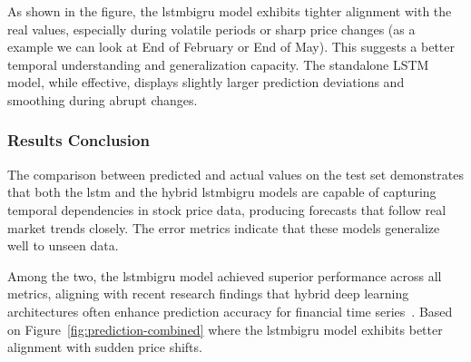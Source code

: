 As shown in the figure, the \acrshort{lstmbigru} model exhibits tighter alignment 
with the real values, especially during volatile periods or sharp price changes 
(as a example we can look at End of February or End of May). This
suggests a better temporal understanding and generalization capacity. The standalone
LSTM model, while effective, displays slightly larger prediction deviations and 
smoothing during abrupt changes.

\subsubsection{Results Conclusion}

The comparison between predicted and actual values on the test set demonstrates that 
both the \acrshort{lstm} and the hybrid \acrshort{lstmbigru} models are capable of 
capturing temporal dependencies in stock price data, producing forecasts that follow 
real market trends closely. The error metrics indicate that these models generalize 
well to unseen data.

Among the two, the \acrshort{lstmbigru} model achieved superior performance across 
all metrics, aligning with recent research findings that hybrid deep learning 
architectures often enhance prediction accuracy for financial time 
series~\parencite{balasubramanian2023SystematicSurvey}. Based on 
Figure~\ref{fig:prediction-combined}
where the \acrshort{lstmbigru} model exhibits better alignment with sudden 
price shifts.
